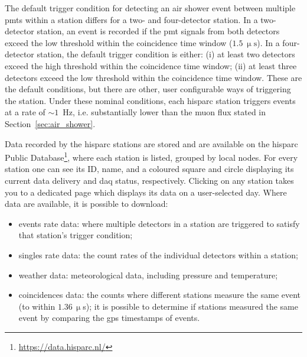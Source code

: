 The default trigger condition for detecting an air shower event between multiple \glspl{pmt} within a station differs for a two- and four-detector station. In a two-detector station, an event is recorded if the \gls{pmt} signals from both detectors exceed the low threshold within the coincidence time window ($1.5~\upmu\mathrm{s}$). In a four-detector station, the default trigger condition is either: (i) at least two detectors exceed the high threshold within the coincidence time window; (ii) at least three detectors exceed the low threshold within the coincidence time window. These are the default conditions, but there are other, user configurable ways of triggering the station. Under these nominal conditions, each \gls{hisparc} station triggers events at a rate of $\sim1$~Hz, i.e. substantially lower than the muon flux stated in Section~\ref{sec:air_shower}.




Data recorded by the \gls{hisparc} stations are stored and are available on the \gls{hisparc} Public Database\footnote{\url{https://data.hisparc.nl/}}, where each station is listed, grouped by local nodes. For every station one can see its ID, name, and a coloured square and circle displaying its current data delivery and \gls{daq} status, respectively. Clicking on any station takes you to a dedicated page which displays its data on a user-selected day. Where data are available, it is possible to download: %
%
\begin{itemize}
	\item{events rate data: where multiple detectors in a station are triggered to satisfy that station's trigger condition;}
	\item{singles rate data: the count rates of the individual detectors within a station;}
	\item{weather data: meteorological data, including pressure and temperature;}
	\item{coincidences data: the counts where different stations measure the same event (to within $1.36 \, \upmu$s); it is possible to determine if stations measured the same event by comparing the \gls{gps} timestamps of events.}
\end{itemize}

